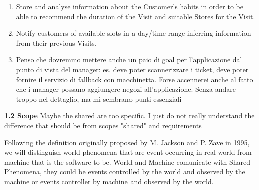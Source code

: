 \documentclass[a4paper, 10pt, oneside]{article}
\newcommand*{\lorenzo}[1]{\textcolor{BurntOrange}{#1}}
\begin{document}
\begin{enumerate}[label={G.\arabic{*}}]
\begin{enumerate}[label={\ref{goal:visit}.\arabic{*}}]
        \item \label{goal:visit:infoForSuggestion} Store and analyse information about the Customer's habits in order to be able to recommend the duration of the Visit and suitable Stores for the Visit.
        \item \label{goal:visit:personalNotifications} Notify customers of available slots in a day/time range inferring information from their previous Visits.
    \item \lorenzo{Penso che dovremmo mettere anche un paio di goal per l'applicazione dal punto di vista del manager: es. deve poter scannerizzare i ticket, deve poter fornire il servizio di fallback con macchinetta. Forse accennerei anche al fatto che i manager possano aggiungere negozi all'applicazione. Senza andare troppo nel dettaglio, ma mi sembrano punti essenziali}
    \end{enumerate}
\end{enumerate}

\pagebreak

{\large \textbf{1.2 Scope}}
\lorenzo{Maybe the shared are too specific. I just do not really understand the difference that should be from scopes "shared" and requirements}

\begin{flushleft}
Following the definition originally proposed by M. Jackson and P. Zave in 1995,
we will distinguish world phenomena that are event occurring in real world from machine
that is the software to be.
World and Machine comunicate with Shared Phenomena, they could be events controlled by the world and observed by the machine or events controller by machine and observed by the world.
\end{flushleft}
\end{document}
